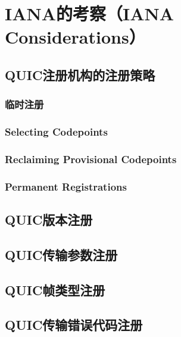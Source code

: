 \section{IANA的考察（IANA Considerations）}
\subsection{QUIC注册机构的注册策略}
\subsubsection{临时注册}
\subsubsection{Selecting Codepoints}
\subsubsection{Reclaiming Provisional Codepoints}
\subsubsection{Permanent Registrations}

\subsection{QUIC版本注册}
\subsection{QUIC传输参数注册}
\subsection{QUIC帧类型注册}
\subsection{QUIC传输错误代码注册}